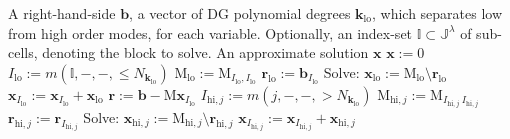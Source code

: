 
\newcommand{\gvec}[1]{\boldsymbol{#1}}
\newcommand{\gmat}[1]{\boldsymbol{\mathrm{#1}}}

\begin{algorithmic}
	\label{alg:pMultigrid}
	\Require A right-hand-side $\gvec{b}$,
	a vector of DG polynomial degrees $\gvec{k}_{\text{lo}}$, 
	which separates low from high order modes, for each variable.
	Optionally, an index-set $\mathbb{I} \subset \mathbb{J}^\lambda$ of 
	sub-cells, denoting the block to solve.
	\Ensure  An approximate solution $\gvec{x}$
	\State
	$\gvec{x} := 0$ 
	\State $I_{\text{lo}} := m(\mathbb{I},-,-,\leq N_{\gvec{k}_{\text{lo}}})$
	\State 
	$\gmat{M}_{\text{lo}} := \gmat{M}_{ I_{\text{lo}} , I_{\text{lo}} }$
	\State 
	$\gvec{r}_{\text{lo}} := \gvec{b}_{ I_{\text{lo}} }$
	\State Solve: $\gvec{x}_{\text{lo}} := \gmat{M}_{\text{lo}} \setminus \gvec{r}_{\text{lo}}$
	\State
	$\gvec{x}_{ I_{\text{lo}} } := \gvec{x}_{ I_{\text{lo}} } + \gvec{x}_{\text{lo}}$
	\State
	$\gvec{r} := \gvec{b} - \gmat{M}\gvec{x}_{ I_{\text{lo}} }$
	\State $I_{\text{hi},j} := m(j,-,-,> N_{\gvec{k}_{\text{lo}}})$
	\State $\gmat{M}_{\text{hi},j} := \gmat{M}_{I_{\text{hi},j} \ I_{\text{hi},j}}$
	\State $\gvec{r}_{\text{hi},j} := \gvec{r}_{ I_{\text{hi},j} }$
	\State Solve: $\gvec{x}_{\text{hi},j} := \gmat{M}_{\text{hi},j} \setminus \gvec{r}_{\text{hi},j}$
	\State $\gvec{x}_{ I_{\text{hi},j} } := \gvec{x}_{ I_{\text{hi},j} } + \gvec{x}_{\text{hi},j}$
	\EndFor
\end{algorithmic}


